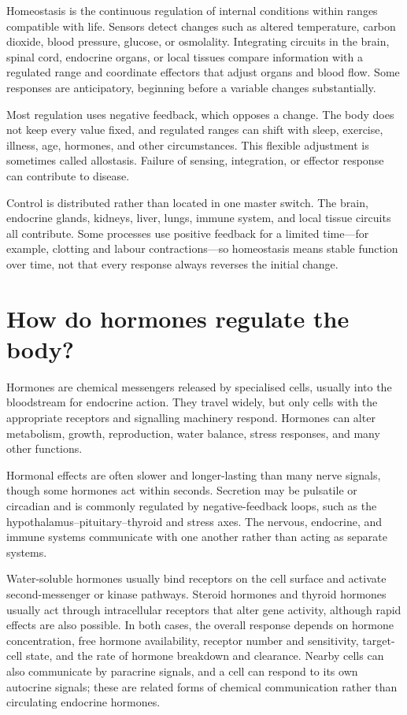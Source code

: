 \documentclass[11pt,oneside]{report}
\begin{document}
Homeostasis is the continuous regulation of internal conditions within ranges
compatible with life. Sensors detect changes such as altered temperature,
carbon dioxide, blood pressure, glucose, or osmolality. Integrating circuits in
the brain, spinal cord, endocrine organs, or local tissues compare information
with a regulated range and coordinate effectors that adjust organs and blood
flow. Some responses are anticipatory, beginning before a variable changes
substantially.

Most regulation uses negative feedback, which opposes a change. The body does
not keep every value fixed, and regulated ranges can shift with sleep,
exercise, illness, age, hormones, and other circumstances. This flexible
adjustment is sometimes called allostasis. Failure of sensing, integration, or
effector response can contribute to disease.

Control is distributed rather than located in one master switch. The brain,
endocrine glands, kidneys, liver, lungs, immune system, and local tissue
circuits all contribute. Some processes use positive feedback for a limited
time---for example, clotting and labour contractions---so homeostasis means
stable function over time, not that every response always reverses the initial
change.

\section{How do hormones regulate the body?}

Hormones are chemical messengers released by specialised cells, usually into
the bloodstream for endocrine action. They travel widely, but only cells with
the appropriate receptors and signalling machinery respond. Hormones can alter
metabolism, growth, reproduction, water balance, stress responses, and many
other functions.

Hormonal effects are often slower and longer-lasting than many nerve signals,
though some hormones act within seconds. Secretion may be pulsatile or
circadian and is commonly regulated by negative-feedback loops, such as the
hypothalamus--pituitary--thyroid and stress axes. The nervous, endocrine, and
immune systems communicate with one another rather than acting as separate
systems.

Water-soluble hormones usually bind receptors on the cell surface and activate
second-messenger or kinase pathways. Steroid hormones and thyroid hormones
usually act through intracellular receptors that alter gene activity, although
rapid effects are also possible. In both cases, the overall response depends on
hormone concentration, free hormone availability, receptor number and
sensitivity, target-cell state, and the rate of hormone breakdown and clearance.
Nearby cells can also communicate by paracrine signals, and a cell can respond
to its own autocrine signals; these are related forms of chemical communication
rather than circulating endocrine hormones.
\end{document}
